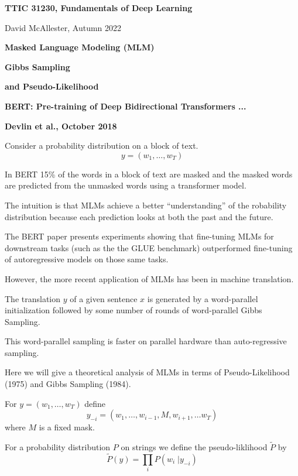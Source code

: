 




{\Huge

  \centerline{\bf TTIC 31230, Fundamentals of Deep Learning}
  \bigskip
  \centerline{David McAllester, Autumn 2022}
  \vfill
  \vfill
  \centerline{\bf Masked Language Modeling (MLM)}
  \vfill
  \centerline{\bf Gibbs Sampling}
  \vfill
  \centerline{\bf and Pseudo-Likelihood}
\vfill
\vfill
\vfill


\centerline{\bf BERT: Pre-training of Deep Bidirectional Transformers ...}
\centerline{\bf Devlin et al., October 2018}

\vfill
Consider a probability distribution on a block of text.
$$y = (w_1, \dots, w_T)$$

\vfill
In BERT 15\% of the words in a block of text are masked and the masked words are predicted from the unmasked words using a transformer model.

\vfill
The intuition is that MLMs achieve a better ``understanding'' of the robability distribution because each prediction looks at both the past and the future.


The BERT paper presents experiments showing that fine-tuning MLMs for downstream tasks (such as the the GLUE benchmark) outperformed fine-tuning 
of autoregressive models on those same tasks.


However, the more recent application of MLMs has been in machine translation.

\vfill
The translation $y$ of a given sentence $x$ is generated by a word-parallel initialization followed by some number of rounds of word-parallel Gibbs Sampling.

\vfill
This word-parallel sampling is faster on parallel hardware than auto-regressive sampling.


Here we will give a theoretical analysis of MLMs in terms of Pseudo-Likelihood (1975) and Gibbs Sampling (1984).

\vfill
For $y = (w_1,\ldots,w_T)$ define
$$y_{-i} = (w_1,\ldots,w_{i-1},M,w_{i+1},\ldots w_T)$$
where $M$ is a fixed mask.

\vfill
For a probability distribution $P$ on strings we define the pseudo-liklihood $\tilde{P}$ by
$$\tilde{P}(y) = \prod_i P(w_i\;|y_{-i})$$

}

